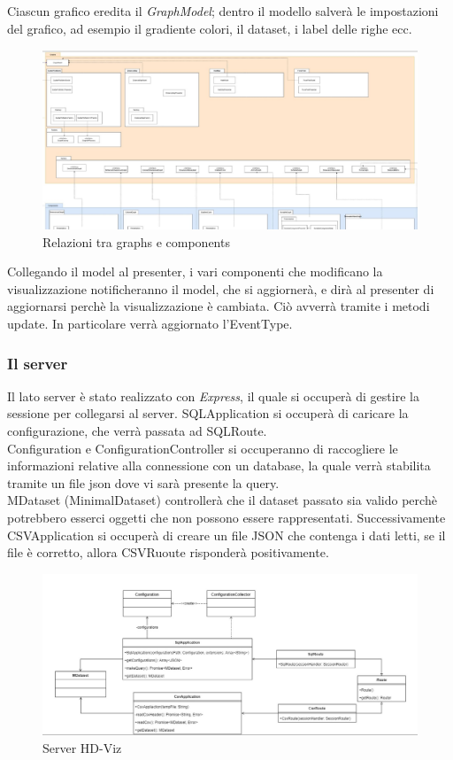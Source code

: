 \documentclass[../manuale_sviluppatore.tex]{subfiles}
\begin{document}
Ciascun grafico eredita il \emph{GraphModel}; dentro il modello salverà le impostazioni del grafico, ad esempio il gradiente colori, il dataset, i label delle righe ecc.

\begin{figure}[H]
	\centering
	\includegraphics[width=18cm]{img/graphs-e-components.jpg}
	\caption{Relazioni tra graphs e components}
\end{figure}


Collegando il model al presenter, i vari componenti che modificano la visualizzazione notificheranno il model, che si aggiornerà, e dirà al presenter di aggiornarsi perchè la visualizzazione è cambiata. 
Ciò avverrà tramite i metodi update. In particolare verrà aggiornato l'EventType.

\subsubsection{Il server}

Il lato server è stato realizzato con \emph{Express}, il quale si occuperà di gestire la sessione per collegarsi al server.
SQLApplication si occuperà di caricare la configurazione, che verrà passata ad SQLRoute.\\
Configuration e ConfigurationController si occuperanno di raccogliere le informazioni relative alla connessione con un database, la quale verrà stabilita tramite un file
json dove vi sarà presente la query.\\
MDataset (MinimalDataset) controllerà che il dataset passato sia valido perchè potrebbero esserci oggetti che non possono essere rappresentati. Successivamente
CSVApplication si occuperà di creare un file JSON che contenga i dati letti, se il file è corretto, allora CSVRuoute risponderà positivamente.

\begin{figure}[H]
	\centering
	\includegraphics[width=18cm]{img/server.jpg}
	\caption{Server HD-Viz}
\end{figure}
\end{document}
